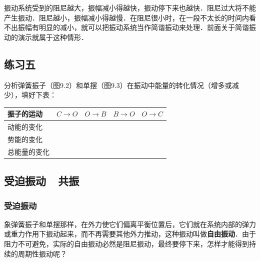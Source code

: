 振动系统受到的阻尼越大，振幅减小得越快，振动停下来也越快．阻尼过大将不能产生振动．阻尼越小，振幅减小得越慢．在阻尼很小时，在一段不太长的时间内看不出振幅有明显的减小，就可以把振动系统当作简谐振动来处理．前面关于简谐振动的演示就属于这种情形．

\subsection*{练习五}
分析弹簧振子（图9.2）和单摆（图9.3）在振动中能量的转化情况（增多或减少），填好下表：
\begin{table}[H]
    \centering
    \begin{tabularx}{0.95\textwidth}{M|M|M|M|M}
        \hline
        振子的运动  & $C\to O$ & $O\to B$ & $B\to O$ & $O\to C$ \\
        \hline
        动能的变化  &          &          &          &          \\
        势能的变化  &          &          &          &          \\
        总能量的变化 &          &          &          &          \\
        \hline
    \end{tabularx}
\end{table}
\subsection{受迫振动~~共振}
\subsubsection{受迫振动}
象弹簧振子和单摆那样，在外力使它们偏离平衡位置后，它们就在系统内部的弹力或重力作用下振动起来，而不再需要其他外力推动，这种振动叫做\textbf{自由振动}．由于阻力不可避免，实际的自由振动必然是阻尼振动，最终要停下来，怎样才能得到持续的周期性振动呢？

